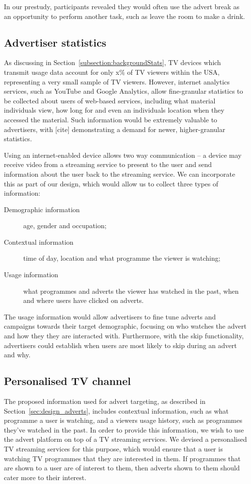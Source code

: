 	In our prestudy, participants revealed they would often use the advert break as an opportunity to perform another task, such as leave the room to make a drink.

\subsection{Advertiser statistics}

	As discussing in Section~\ref{subsection:backgroundStats}, TV devices which transmit usage data account for only x\% of TV viewers within the USA, representing a very small sample of TV viewers. However, internet analytics services, such as YouTube and Google Analytics, allow fine-granular statistics to be collected about users of web-based services, including what material individuals view, how long for and even an individuals location when they accessed the material. Such information would be extremely valuable to advertisers, with [cite] demonstrating a demand for newer, higher-granular statistics.

	Using an internet-enabled device allows two way communication -- a device may receive video from a streaming service to present to the user and send information about the user back to the streaming service. We can incorporate this as part of our design, which would allow us to collect three types of information:
	\begin{description}
	\item[Demographic information] age, gender and occupation;
	\item[Contextual information] time of day, location and what programme the viewer is watching;
	\item[Usage information] what programmes and adverts the viewer has watched in the past, when and where users have clicked on adverts.
	\end{description}

	The usage information would allow advertisers to fine tune adverts and campaigns towards their target demographic, focusing on who watches the advert and how they they are interacted with. Furthermore, with the skip functionality, advertisers could establish when users are most likely to skip during an advert and why.

\subsection{Personalised TV channel}

	The proposed information used for advert targeting, as described in Section~\ref{sec:design_adverts}, includes contextual information, such as what programme a user is watching, and a viewers usage history, such as programmes they've watched in the past. In order to provide this information, we wish to use the advert platform on top of a TV streaming services. We devised a personalised TV streaming services for this purpose, which would ensure that a user is watching TV programmes that they are interested in them. If programmes that are shown to a user are of interest to them, then adverts shown to them should cater more to their interest.

